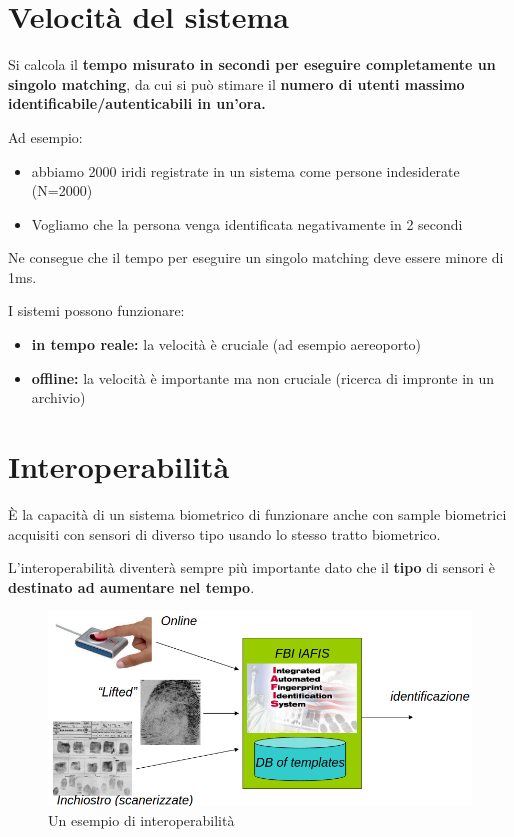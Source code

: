 \documentclass{report}
\begin{document}
\section{Velocità del sistema}

Si calcola il \textbf{tempo misurato in secondi per eseguire completamente un singolo matching}, da cui si può stimare il \textbf{numero di utenti massimo identificabile/autenticabili in un'ora.}

\noindent Ad esempio:
\begin{itemize}
    \item abbiamo 2000 iridi registrate in un sistema come persone indesiderate (N=2000)
    \item Vogliamo che la persona venga identificata negativamente in 2 secondi
\end{itemize}
Ne consegue che il tempo per eseguire un singolo matching deve essere minore di 1ms.

I sistemi possono funzionare:
\begin{itemize}
    \item \textbf{in tempo reale:} la velocità è cruciale (ad esempio aereoporto)
    \item \textbf{offline:} la velocità è importante ma non cruciale (ricerca di impronte in un archivio)
\end{itemize}

\newpage
\section{Interoperabilità}

È la capacità di un sistema biometrico di funzionare anche con sample biometrici acquisiti con sensori di diverso tipo usando lo stesso tratto biometrico.

\noindent L'interoperabilità diventerà sempre più importante dato che il \textbf{tipo} di sensori è \textbf{destinato ad aumentare nel tempo}.

\begin{figure}[h]
    \centering
    \includegraphics[width=0.95\linewidth]{images/interoperabilita.png}
    \caption{Un esempio di interoperabilità}
    \label{fig:interoperabilita}
\end{figure}
\end{document}
